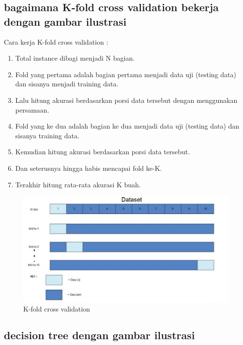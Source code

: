 \subsection{bagaimana K-fold cross validation bekerja dengan gambar ilustrasi}

\par Cara kerja K-fold cross validation :
\begin{enumerate}
\item Total instance dibagi menjadi N bagian.
\item Fold yang pertama adalah bagian pertama menjadi data uji (testing data) dan sisanya menjadi training data.
\item Lalu hitung akurasi berdasarkan porsi data tersebut dengan menggunakan persamaan.
\item Fold yang ke dua adalah bagian ke dua menjadi data uji (testing data) dan sisanya training data. 
\item Kemudian hitung akurasi berdasarkan porsi data tersebut.
\item Dan seterusnya hingga habis mencapai fold ke-K.
\item Terakhir hitung rata-rata akurasi K buah.
\end{enumerate}



\begin{figure}[ht]
\centering
\includegraphics[scale=0.5]{figures/f5.jpg}
\caption{K-fold cross validation }
\label{contoh}
\end{figure}

\subsection{decision tree dengan gambar ilustrasi}

